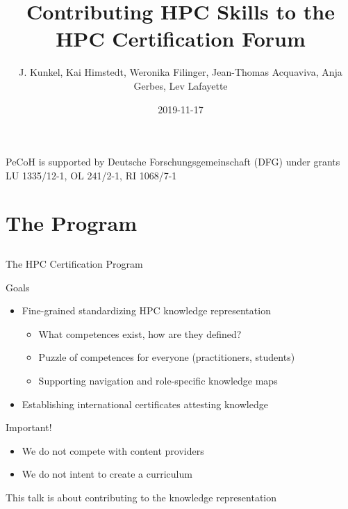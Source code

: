 \documentclass[compress,aspectratio=169]{beamer}
\subtitle{}
\title{\Large Contributing HPC Skills to the HPC Certification Forum}
\author{J. Kunkel, Kai Himstedt, Weronika Filinger, Jean-Thomas Acquaviva, Anja Gerbes, Lev Lafayette}
\date{2019-11-17}
\institute{Department of Computer Science}
\begin{document}
\begin{frame}[plain]{}
	\maketitle
	{\fontsize{5.85pt}{6pt}\selectfont PeCoH is supported by Deutsche Forschungsgemeinschaft (DFG) under grants LU 1335/12-1, OL 241/2-1, RI 1068/7-1}
\end{frame}



\section{The Program}
\sectionIntroHidden

\subsection{}

\begin{frame}{The HPC Certification Program}
		\begin{block}{Goals}
			\begin{itemize}
				\item Fine-grained standardizing HPC knowledge representation
          \begin{itemize}
            \item What competences exist, how are they defined?
            \item Puzzle of competences for everyone (practitioners, students)
            \item Supporting navigation and role-specific knowledge maps
          \end{itemize}
				\item Establishing international certificates attesting knowledge
			\end{itemize}
		\end{block}

		\begin{block}{Important!}
			\begin{itemize}
				\item We do not compete with content providers
				\item We do not intent to create a curriculum
			\end{itemize}
		\end{block}

    \begin{block}{This talk is about contributing to the knowledge representation}
    \end{block}
\end{frame}
\end{document}
